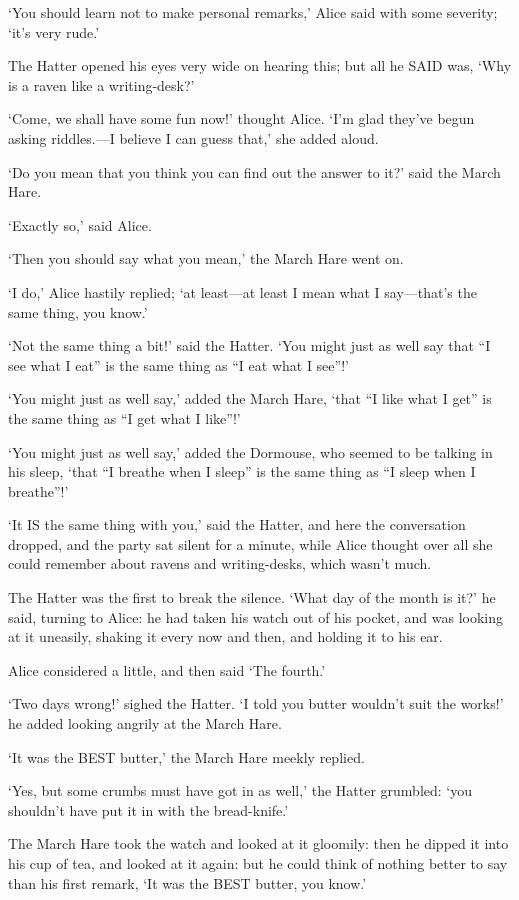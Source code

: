 \documentclass[12pt]{book}
\begin{document}
\begin{Parallel}[p]{}{}
{‘You should learn not to make personal remarks,’ Alice said with some severity; ‘it’s very rude.’

The Hatter opened his eyes very wide on hearing this; but all he SAID was, ‘Why is a raven like a writing-desk?’

‘Come, we shall have some fun now!’ thought Alice. ‘I’m glad they’ve begun asking riddles.—I believe I can guess that,’ she added aloud.

‘Do you mean that you think you can find out the answer to it?’ said the March Hare.

‘Exactly so,’ said Alice.

‘Then you should say what you mean,’ the March Hare went on.

‘I do,’ Alice hastily replied; ‘at least—at least I mean what I say—that’s the same thing, you know.’

‘Not the same thing a bit!’ said the Hatter. ‘You might just as well say that “I see what I eat” is the same thing as “I eat what I see”!’

‘You might just as well say,’ added the March Hare, ‘that “I like what I get” is the same thing as “I get what I like”!’

‘You might just as well say,’ added the Dormouse, who seemed to be talking in his sleep, ‘that “I breathe when I sleep” is the same thing as “I sleep when I breathe”!’

‘It IS the same thing with you,’ said the Hatter, and here the conversation dropped, and the party sat silent for a minute, while Alice thought over all she could remember about ravens and writing-desks, which wasn’t much.

The Hatter was the first to break the silence. ‘What day of the month is it?’ he said, turning to Alice: he had taken his watch out of his pocket, and was looking at it uneasily, shaking it every now and then, and holding it to his ear.

Alice considered a little, and then said ‘The fourth.’

‘Two days wrong!’ sighed the Hatter. ‘I told you butter wouldn’t suit the works!’ he added looking angrily at the March Hare.

‘It was the BEST butter,’ the March Hare meekly replied.

‘Yes, but some crumbs must have got in as well,’ the Hatter grumbled: ‘you shouldn’t have put it in with the bread-knife.’

The March Hare took the watch and looked at it gloomily: then he dipped it into his cup of tea, and looked at it again: but he could think of nothing better to say than his first remark, ‘It was the BEST butter, you know.’

}
\end{Parallel}
\end{document}

